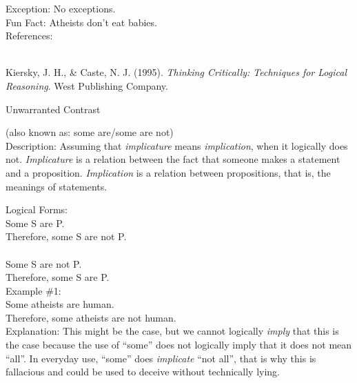 \documentclass[a4paper,12pt,single,pdftex]{scrbook}
\begin{document}
    
      Exception: No exceptions.
    \\

    
      Fun Fact: Atheists don’t eat babies.
    \\

    References:

    
      
        
      \\

      
        
          Kiersky, J. H., \& Caste, N. J. (1995). {\it Thinking Critically: Techniques for Logical Reasoning}. West Publishing Company.
        
      
    
  

Unwarranted Contrast
    
      (also known as: some are/some are not)
    \\

  
    Description: Assuming that {\it implicature} means {\it implication}, when it logically does not.  {\it Implicature} is a relation between the fact that someone makes a statement and a proposition.  {\it Implication}  is a relation between propositions, that is, the meanings of statements.

    
      Logical Forms:
    \\

    
      Some S are P.
    \\

    
      Therefore, some S are not P.      
    \\

    
       
    \\

    
      Some S are not P.
    \\

    
      Therefore, some S are P.
    \\

    
      Example \#1:
    \\

    
      Some atheists are human.
    \\

    
      Therefore, some atheists are not human.
    \\

    
      Explanation: This might be the case, but we cannot logically {\it imply}  that this is the case because the use of “some” does not logically imply that it does not mean “all”.  In everyday use, “some” does {\it implicate}  “not all”, that is why this is fallacious and could be used to deceive without technically lying.
    \\
\end{document}
